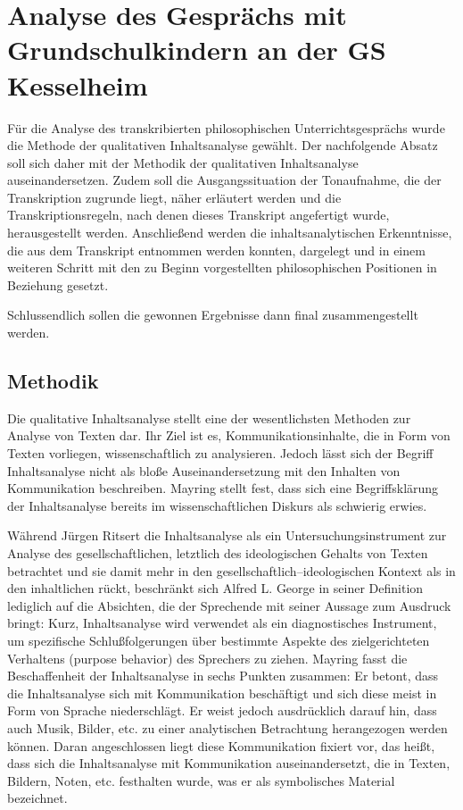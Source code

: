 \section{Analyse des Gesprächs mit Grundschulkindern an der GS Kesselheim}

Für die Analyse des transkribierten philosophischen Unterrichtsgesprächs wurde die Methode der qualitativen Inhaltsanalyse gewählt. 
Der nachfolgende Absatz soll sich daher mit der Methodik der qualitativen Inhaltsanalyse auseinandersetzen. 
Zudem soll die Ausgangssituation der Tonaufnahme, die der Transkription zugrunde liegt, näher erläutert werden und die Transkriptionsregeln, nach denen dieses Transkript angefertigt wurde, herausgestellt werden. 
Anschließend werden die inhaltsanalytischen Erkenntnisse, die aus dem Transkript entnommen werden konnten, dargelegt und in einem weiteren Schritt mit den zu Beginn vorgestellten philosophischen Positionen in Beziehung gesetzt.

Schlussendlich sollen die gewonnen Ergebnisse dann final zusammengestellt werden.


\subsection{ Methodik}

Die qualitative Inhaltsanalyse stellt eine der wesentlichsten Methoden zur Analyse von Texten dar. 
Ihr Ziel ist es, \glqq Kommunikationsinhalte, die in Form von Texten vorliegen, wissenschaftlich zu analysieren.\grqq{}\cite[S.\,20]{WK07}
Jedoch lässt sich der Begriff \glqq Inhaltsanalyse\grqq{} nicht als bloße Auseinandersetzung mit den Inhalten von Kommunikation beschreiben. 
Mayring stellt fest, dass sich eine Begriffsklärung der Inhaltsanalyse bereits im wissenschaftlichen Diskurs als schwierig erwies. 

Während Jürgen Ritsert die Inhaltsanalyse als \glqq ein Untersuchungsinstrument zur Analyse des \glqq gesellschaftlichen\grqq{}, letztlich des \glqq ideologischen Gehalts\grqq{} von Texten\grqq{}\cite[S.\,11]{JR07} betrachtet und sie damit mehr in den gesellschaftlich--ideologischen Kontext als in den inhaltlichen rückt, beschränkt sich Alfred L. George in seiner Definition lediglich auf die Absichten, die der Sprechende mit seiner Aussage zum Ausdruck bringt: 
\glqq Kurz, Inhaltsanalyse wird verwendet als ein diagnostisches Instrument, um spezifische Schlußfolgerungen über bestimmte Aspekte des zielgerichteten Verhaltens (purpose behavior) des Sprechers zu ziehen.\grqq{}\cite[S.\,11]{AG07}
Mayring fasst die Beschaffenheit der Inhaltsanalyse in sechs Punkten zusammen: 
Er betont, dass die Inhaltsanalyse sich mit Kommunikation beschäftigt und sich diese meist in Form von Sprache niederschlägt. 
Er weist jedoch ausdrücklich darauf hin, dass auch Musik, Bilder, etc. zu einer analytischen Betrachtung herangezogen werden können. 
Daran angeschlossen liegt diese Kommunikation fixiert vor, das heißt, dass sich die Inhaltsanalyse mit Kommunikation auseinandersetzt, die in Texten, Bildern, Noten, etc. festhalten wurde, was er als symbolisches Material bezeichnet\cite[S.\,12]{PM07}.

